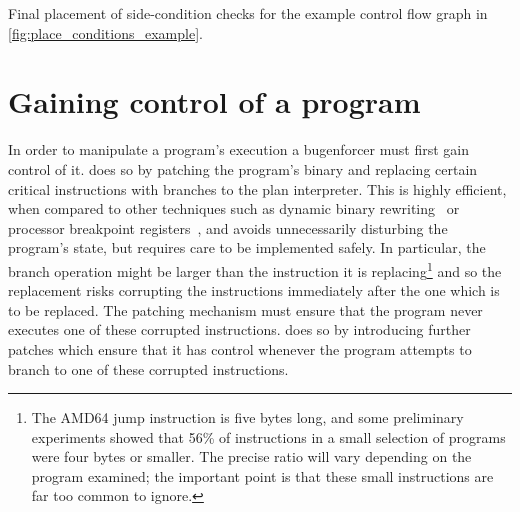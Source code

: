 \begin{sanefig}
  \caption{Final placement of side-condition checks for the example
    control flow graph in \autoref{fig:place_conditions_example}.}
  \label{fig:place_conditions_example:result}
\end{sanefig}

\section{Gaining control of a program}
\label{sect:enforce:gain_control}

In order to manipulate a program's execution a \gls{bugenforcer} must
first gain control of it.  {\Implementation} does so by patching the
program's binary and replacing certain critical instructions with
branches to the \gls{plan interpreter}.  This is highly efficient,
when compared to other techniques such as dynamic binary
rewriting~\cite{Nethercote2007,Luk2005} or processor breakpoint
registers~\cite[Chapter 16.2: Debug Registers]{Intel2009}, and avoids
unnecessarily disturbing the program's state, but requires care to be
implemented safely.  In particular, the branch operation might be
larger than the instruction it is replacing\footnote{The AMD64 jump
  instruction is five bytes long, and some preliminary experiments
  showed that 56\% of instructions in a small selection of programs
  were four bytes or smaller.  The precise ratio will vary depending
  on the program examined; the important point is that these small
  instructions are far too common to ignore.} and so the replacement
risks corrupting the instructions immediately after the one which is
to be replaced.  The patching mechanism must ensure that the program
never executes one of these corrupted instructions.  {\Implementation}
does so by introducing further patches which ensure that it has
control whenever the program attempts to branch to one of these
corrupted instructions.

